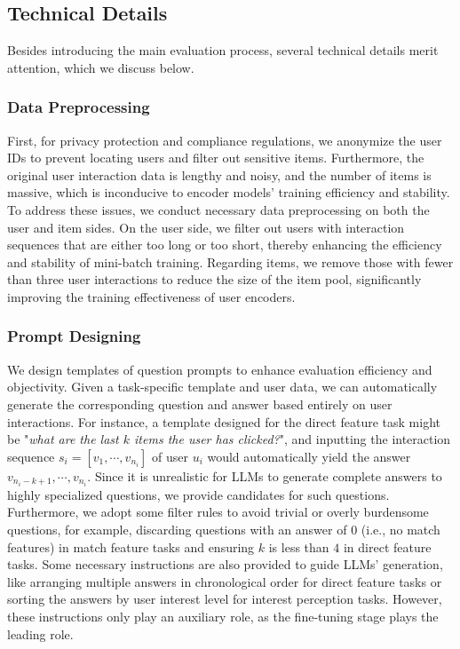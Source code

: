 \subsection{Technical Details}
Besides introducing the main evaluation process, several technical details merit attention, which we discuss below. 

\subsubsection{\textbf{Data Preprocessing}} 
\label{sec:data}
First, for privacy protection and compliance regulations, we anonymize the user IDs to prevent locating users and filter out sensitive items. Furthermore, the original user interaction data is lengthy and noisy, and the number of items is massive, which is inconducive to encoder models' training efficiency and stability. To address these issues, we conduct necessary data preprocessing on both the user and item sides. 
On the user side, we filter out users with interaction sequences that are either too long or too short, thereby enhancing the efficiency and stability of mini-batch training.
Regarding items, we remove those with fewer than three user interactions to reduce the size of the item pool, significantly improving the training effectiveness of user encoders.

\subsubsection{\textbf{Prompt Designing}} 
\label{sec:prompt}
We design templates of question prompts to enhance evaluation efficiency and objectivity. Given a task-specific template and user data, we can automatically generate the corresponding question and answer based entirely on user interactions. 
For instance, a template designed for the direct feature task might be "\textit{what are the last $k$ items the user has clicked?}", and inputting the interaction sequence $s_i = [v_1,\cdots,v_{n_i}]$ of user $u_i$ would automatically yield the answer $v_{n_i-k+1},\cdots,v_{n_i}$. 
Since it is unrealistic for LLMs to generate complete answers to highly specialized questions, we provide candidates for such questions. 
Furthermore, we adopt some filter rules to avoid trivial or overly burdensome questions, for example, discarding questions with an answer of $0$ (i.e., no match features) in match feature tasks and ensuring $k$ is less than $4$ in direct feature tasks. 
Some necessary instructions are also provided to guide LLMs' generation, like arranging multiple answers in chronological order for direct feature tasks or sorting the answers by user interest level for interest perception tasks. However, these instructions only play an auxiliary role, as the fine-tuning stage plays the leading role.


